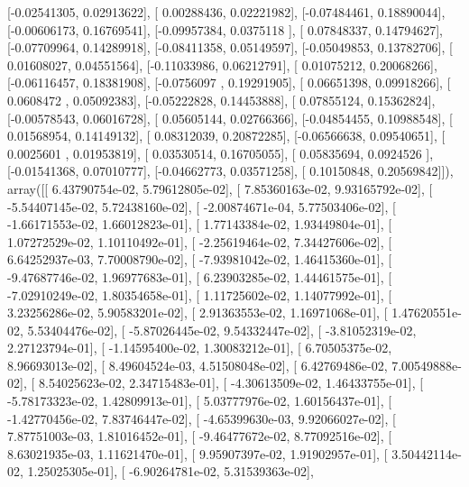 \documentclass{article}
\begin{document}
       [-0.02541305,  0.02913622],
       [ 0.00288436,  0.02221982],
       [-0.07484461,  0.18890044],
       [-0.00606173,  0.16769541],
       [-0.09957384,  0.0375118 ],
       [ 0.07848337,  0.14794627],
       [-0.07709964,  0.14289918],
       [-0.08411358,  0.05149597],
       [-0.05049853,  0.13782706],
       [ 0.01608027,  0.04551564],
       [-0.11033986,  0.06212791],
       [ 0.01075212,  0.20068266],
       [-0.06116457,  0.18381908],
       [-0.0756097 ,  0.19291905],
       [ 0.06651398,  0.09918266],
       [ 0.0608472 ,  0.05092383],
       [-0.05222828,  0.14453888],
       [ 0.07855124,  0.15362824],
       [-0.00578543,  0.06016728],
       [ 0.05605144,  0.02766366],
       [-0.04854455,  0.10988548],
       [ 0.01568954,  0.14149132],
       [ 0.08312039,  0.20872285],
       [-0.06566638,  0.09540651],
       [ 0.0025601 ,  0.01953819],
       [ 0.03530514,  0.16705055],
       [ 0.05835694,  0.0924526 ],
       [-0.01541368,  0.07010777],
       [-0.04662773,  0.03571258],
       [ 0.10150848,  0.20569842]]), array([[  6.43790754e-02,   5.79612805e-02],
       [  7.85360163e-02,   9.93165792e-02],
       [ -5.54407145e-02,   5.72438160e-02],
       [ -2.00874671e-04,   5.77503406e-02],
       [ -1.66171553e-02,   1.66012823e-01],
       [  1.77143384e-02,   1.93449804e-01],
       [  1.07272529e-02,   1.10110492e-01],
       [ -2.25619464e-02,   7.34427606e-02],
       [  6.64252937e-03,   7.70008790e-02],
       [ -7.93981042e-02,   1.46415360e-01],
       [ -9.47687746e-02,   1.96977683e-01],
       [  6.23903285e-02,   1.44461575e-01],
       [ -7.02910249e-02,   1.80354658e-01],
       [  1.11725602e-02,   1.14077992e-01],
       [  3.23256286e-02,   5.90583201e-02],
       [  2.91363553e-02,   1.16971068e-01],
       [  1.47620551e-02,   5.53404476e-02],
       [ -5.87026445e-02,   9.54332447e-02],
       [ -3.81052319e-02,   2.27123794e-01],
       [ -1.14595400e-02,   1.30083212e-01],
       [  6.70505375e-02,   8.96693013e-02],
       [  8.49604524e-03,   4.51508048e-02],
       [  6.42769486e-02,   7.00549888e-02],
       [  8.54025623e-02,   2.34715483e-01],
       [ -4.30613509e-02,   1.46433755e-01],
       [ -5.78173323e-02,   1.42809913e-01],
       [  5.03777976e-02,   1.60156437e-01],
       [ -1.42770456e-02,   7.83746447e-02],
       [ -4.65399630e-03,   9.92066027e-02],
       [  7.87751003e-03,   1.81016452e-01],
       [ -9.46477672e-02,   8.77092516e-02],
       [  8.63021935e-03,   1.11621470e-01],
       [  9.95907397e-02,   1.91902957e-01],
       [  3.50442114e-02,   1.25025305e-01],
       [ -6.90264781e-02,   5.31539363e-02],
\end{document}
